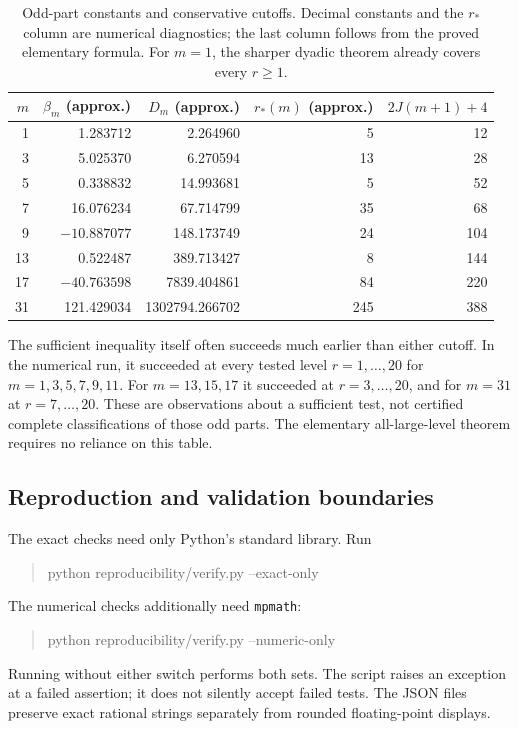\documentclass[11pt,a4paper]{article}
\numberwithin{equation}{section}
\theoremstyle{plain}
\theoremstyle{definition}
\theoremstyle{remark}
\newcommand{\code}[1]{\texttt{\small #1}}
\begin{document}
\begin{table}[htbp]
\centering
\caption{Odd-part constants and conservative cutoffs. Decimal constants and
the $r_*$ column are numerical diagnostics; the last column follows from the
proved elementary formula. For $m=1$, the sharper dyadic theorem already
covers every $r\ge1$.}
\label{tab:constants}
\begin{tabular}{@{}rrrrr@{}}
\toprule
$m$ & $\beta_m$ (approx.) & $D_m$ (approx.) & $r_*(m)$ (approx.)
 & $2J(m+1)+4$\\
\midrule
1 & 1.283712 & 2.264960 & 5 & 12\\
3 & 5.025370 & 6.270594 & 13 & 28\\
5 & 0.338832 & 14.993681 & 5 & 52\\
7 & 16.076234 & 67.714799 & 35 & 68\\
9 & $-10.887077$ & 148.173749 & 24 & 104\\
13 & 0.522487 & 389.713427 & 8 & 144\\
17 & $-40.763598$ & 7839.404861 & 84 & 220\\
31 & 121.429034 & 1302794.266702 & 245 & 388\\
\bottomrule
\end{tabular}
\end{table}

The sufficient inequality itself often succeeds much earlier than either
cutoff. In the numerical run, it succeeded at every tested level
$r=1,\ldots,20$ for $m=1,3,5,7,9,11$. For $m=13,15,17$ it succeeded
at $r=3,\ldots,20$, and for $m=31$ at $r=7,\ldots,20$. These are
observations about a sufficient test, not certified complete
classifications of those odd parts. The elementary all-large-level theorem
requires no reliance on this table.

\subsection{Reproduction and validation boundaries}

The exact checks need only Python's standard library. Run
\begin{quote}\small\ttfamily
python reproducibility/verify.py --exact-only
\end{quote}
The numerical checks additionally need \code{mpmath}:
\begin{quote}\small\ttfamily
python reproducibility/verify.py --numeric-only
\end{quote}
Running without either switch performs both sets. The script raises an
exception at a failed assertion; it does not silently accept failed tests.
The JSON files preserve exact rational strings separately from rounded
floating-point displays.
\end{document}
